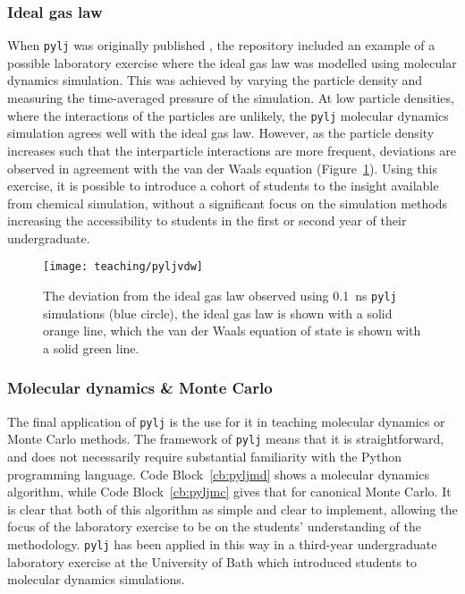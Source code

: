 \subsubsection{Ideal gas law}
When \texttt{pylj} was originally published \cite{mccluskey_pylj_2018}, the repository included an example of a possible laboratory exercise where the ideal gas law was modelled using molecular dynamics simulation.
This was achieved by varying the particle density and measuring the time-averaged pressure of the simulation.
At low particle densities, where the interactions of the particles are unlikely, the \texttt{pylj} molecular dynamics simulation agrees well with the ideal gas law.
However, as the particle density increases such that the interparticle interactions are more frequent, deviations are observed in agreement with the van der Waals equation (Figure~\ref{fig:vdw}).
Using this exercise, it is possible to introduce a cohort of students to the insight available from chemical simulation, without a significant focus on the simulation methods increasing the accessibility to students in the first or second year of their undergraduate.
%
\begin{figure}
    \centering
    \texttt{[image: teaching/pyljvdw]}
    \caption{The deviation from the ideal gas law observed using \SI{0.1}{\nano\second} \texttt{pylj} simulations (blue circle), the ideal gas law is shown with a solid orange line, which the van der Waals equation of state is shown with a solid green line.}
    \label{fig:vdw}
\end{figure}
%

\subsubsection{Molecular dynamics \& Monte Carlo}
The final application of \texttt{pylj} is the use for it in teaching molecular dynamics or Monte Carlo methods.
The framework of \texttt{pylj} means that it is straightforward, and does not necessarily require substantial familiarity with the Python programming language.
Code Block~\ref{cb:pyljmd} shows a molecular dynamics algorithm, while Code Block~\ref{cb:pyljmc} gives that for canonical Monte Carlo.
It is clear that both of this algorithm as simple and clear to implement, allowing the focus of the laboratory exercise to be on the students' understanding of the methodology.
\texttt{pylj} has been applied in this way in a third-year undergraduate laboratory exercise at the University of Bath which introduced students to molecular dynamics simulations.
%
\begin{figure}
    \centering
        
\end{figure}
%

